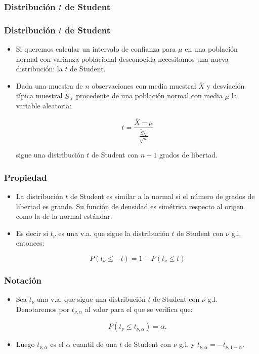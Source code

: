 \subsubsection{Distribución $t$ de Student}

\begin{frame}
\frametitle{Distribución $t$ de Student}
\begin{itemize}
\item Si queremos calcular  un intervalo de confianza para $\mu$ en una población  normal con varianza poblacional  desconocida
necesitamos una nueva  distribución: la $t$ de Student.
\item  Dada una muestra de $n$ observaciones con media muestral $\overline{X}$ y
       desviación típica muestral $\tilde{S}_{X}$ procedente de una población
       normal con media $\mu$  la variable aleatoria:

       $$t=\frac{\overline{X}-\mu}{\frac{\tilde{S}_{X}}{\sqrt{n}}}$$

       sigue una distribución $t$ de Student con $n-1$ grados de libertad.
\end{itemize}
\end{frame}

\begin{frame}
       \frametitle{Propiedad}
\begin{itemize}
\item La distribución $t$ de Student es similar a la normal si el número de grados de libertad es grande.  Su función de densidad
es simétrica respecto al origen como la de la normal estándar.
\item  Es decir si $t_{\nu}$ es una v.a. que sigue la distribución $t$ de Student con $\nu$ g.l. entonces:

       $$P(t_{\nu}\leq -t)=1-P(t_{\nu}\leq t)$$
\end{itemize}
\end{frame}

\begin{frame}
 \frametitle{Notación}
\begin{itemize}
\item  Sea $t_{\nu}$  una v.a. que sigue una distribución  $t$ de Student con $\nu$ g.l. Denotaremos por $t_{\nu,\alpha}$ al
valor para el que se verifica que:

          $$P(t_{\nu}\leq t_{\nu,\alpha})=\alpha.$$
\item Luego $t_{\nu,\alpha}$ es el $\alpha$ cuantil de una $t$ de
         Student con $\nu$ g.l. y  $t_{\nu,\alpha}=-t_{\nu,1-\alpha}.$
\end{itemize}
\end{frame}
